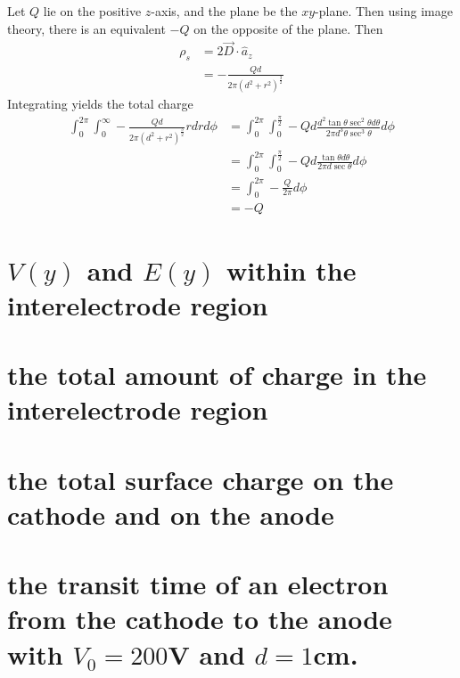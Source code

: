 \documentclass[answers]{exam}
\begin{document}
\begin{questions}
\begin{solution}
    Let $Q$ lie on the positive $z$-axis, and the plane be the $xy$-plane. Then using image theory, there is an equivalent $-Q$ on the opposite of the plane. Then
    \begin{align*}
        \rho_s &= 2\vec{D} \cdot \hat{a}_z \\
               &= -\frac{Qd}{2\pi(d^2+r^2)^{\frac{3}{2}}}
    \end{align*}
    Integrating yields the total charge
    \begin{align*}
        \int_0^{2\pi} \int_0^\infty -\frac{Qd}{2\pi(d^2+r^2)^{\frac{3}{2}}} rdrd\phi &= \int_0^{2\pi} \int_0^{\frac{\pi}{2}} -Qd\frac{d^2\tan\theta\sec^2\theta d\theta}{2\pi d^3\theta\sec^3\theta} d\phi \\
                                                                                     &= \int_0^{2\pi} \int_0^{\frac{\pi}{2}} -Qd \frac{\tan\theta d\theta}{2\pi d\sec\theta} d\phi \\
                                                                                     &= \int_0^{2\pi} -\frac{Q}{2\pi} d\phi \\
                                                                                     &= -Q
    \end{align*}
\end{solution}


\begin{parts}
    \part{$V(y)$ and $E(y)$ within the interelectrode region}
    \part{the total amount of charge in the interelectrode region}
    \part{the total surface charge on the cathode and on the anode}
    \part{the transit time of an electron from the cathode to the anode with $V_0 = 200$V and $d = 1$cm.}
\end{parts}


\end{questions}
\end{document}
